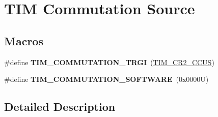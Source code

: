 \hypertarget{group___t_i_m___commutation___source}{}\section{T\+IM Commutation Source}
\label{group___t_i_m___commutation___source}
\subsection*{Macros}
\begin{DoxyCompactItemize}
\item 
\mbox{\label{group___t_i_m___commutation___source_gab2e11763b5e061a5b3056ac970f57ab1}} 
\#define {\bfseries T\+I\+M\+\_\+\+C\+O\+M\+M\+U\+T\+A\+T\+I\+O\+N\+\_\+\+T\+R\+GI}~(\hyperlink{group___peripheral___registers___bits___definition_gaf0328c1339b2b1633ef7a8db4c02d0d5}{T\+I\+M\+\_\+\+C\+R2\+\_\+\+C\+C\+US})
\item 
\mbox{\label{group___t_i_m___commutation___source_ga9cd117a69cbca219c1cf29e74746a496}} 
\#define {\bfseries T\+I\+M\+\_\+\+C\+O\+M\+M\+U\+T\+A\+T\+I\+O\+N\+\_\+\+S\+O\+F\+T\+W\+A\+RE}~(0x0000\+U)
\end{DoxyCompactItemize}


\subsection{Detailed Description}
